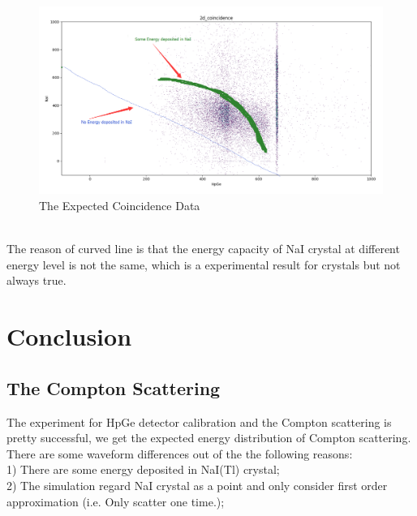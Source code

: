 \documentclass[12pt]{article}
\begin{document}
	\begin{figure}[h]
		\centering
		\includegraphics[width=0.7\linewidth, height=0.4\textheight]{pic/Coin_hist_2nd_Geo_expected_coin}
		\caption{The Expected Coincidence Data}
		\label{fig:coinhist2ndgeoexpectedcoin}
	\end{figure}\\
	The reason of curved line is that the energy capacity of NaI crystal at different energy level is not the same, which is a experimental result for crystals but not always true.	
	\section{Conclusion}
	\subsection{The Compton Scattering }
	The experiment for HpGe detector calibration and the Compton scattering is pretty successful, we get the expected energy distribution of Compton scattering. There are some waveform differences out of the the following reasons:\\
	1) There are some energy deposited in NaI(Tl) crystal;\\
	2) The simulation regard NaI crystal as a point and only consider first order approximation (i.e. Only scatter one time.);
	
	
\end{document}
